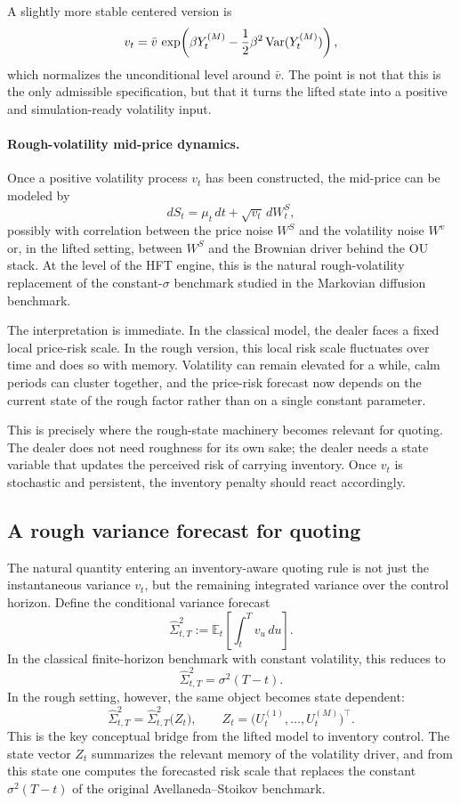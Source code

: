 A slightly more stable centered version is
\[
v_t
=
\bar v\,
\exp\!\left(
\beta Y_t^{(M)}
-\frac12\beta^2\operatorname{Var}(Y_t^{(M)})
\right),
\]
which normalizes the unconditional level around \(\bar v\). The point is not that this is the only admissible specification, but that it turns the lifted state into a positive and simulation-ready volatility input.

\paragraph{Rough-volatility mid-price dynamics.}

Once a positive volatility process \(v_t\) has been constructed, the mid-price can be modeled by
\[
dS_t = \mu_t\,dt + \sqrt{v_t}\,dW_t^S,
\]
possibly with correlation between the price noise \(W^S\) and the volatility noise \(W^v\) or, in the lifted setting, between \(W^S\) and the Brownian driver behind the OU stack. At the level of the HFT engine, this is the natural rough-volatility replacement of the constant-\(\sigma\) benchmark studied in the Markovian diffusion benchmark.

The interpretation is immediate. In the classical model, the dealer faces a fixed local price-risk scale. In the rough version, this local risk scale fluctuates over time and does so with memory. Volatility can remain elevated for a while, calm periods can cluster together, and the price-risk forecast now depends on the current state of the rough factor rather than on a single constant parameter.

This is precisely where the rough-state machinery becomes relevant for quoting. The dealer does not need roughness for its own sake; the dealer needs a state variable that updates the perceived risk of carrying inventory. Once \(v_t\) is stochastic and persistent, the inventory penalty should react accordingly.

\subsection{A rough variance forecast for quoting}

The natural quantity entering an inventory-aware quoting rule is not just the instantaneous variance \(v_t\), but the remaining integrated variance over the control horizon. Define the conditional variance forecast
\[
\widehat{\Sigma}_{t,T}^2
:=
\mathbb{E}_t\!\left[\int_t^T v_u\,du\right].
\]
In the classical finite-horizon benchmark with constant volatility, this reduces to
\[
\widehat{\Sigma}_{t,T}^2 = \sigma^2(T-t).
\]
In the rough setting, however, the same object becomes state dependent:
\[
\widehat{\Sigma}_{t,T}^2
=
\widehat{\Sigma}_{t,T}^2\bigl(Z_t\bigr),
\qquad
Z_t=\bigl(U_t^{(1)},\dots,U_t^{(M)}\bigr)^\top.
\]
This is the key conceptual bridge from the lifted model to inventory control. The state vector \(Z_t\) summarizes the relevant memory of the volatility driver, and from this state one computes the forecasted risk scale that replaces the constant \(\sigma^2(T-t)\) of the original Avellaneda--Stoikov benchmark.

